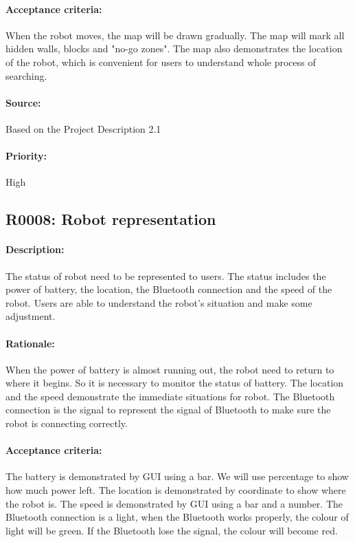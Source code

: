 \documentclass[11pt, a4paper]{report}
\begin{document}
\paragraph{Acceptance criteria:}
When the robot moves, the map will be drawn gradually. The map will mark all hidden walls, blocks and "no-go zones". The map also demonstrates the location of the robot, which is convenient for users to understand whole process of searching.
\paragraph{Source:}
Based on the Project Description 2.1
\paragraph{Priority:}
High



\subsection{R0008: Robot representation}
\paragraph{Description:}
The status of robot need to be represented to users. The status includes the power of battery, the location, the Bluetooth connection and the speed of the robot. Users are able to understand the  robot's situation and make some adjustment.
\paragraph{Rationale:}
When the power of battery is almost running out, the robot need to return to where it begins. So it is necessary to monitor the status of battery. The location and the speed demonstrate the immediate situations for robot. The Bluetooth connection is the signal to represent the signal of Bluetooth to make sure the robot is connecting correctly.
\paragraph{Acceptance criteria:}
The battery is demonstrated by GUI using a bar. We will use percentage to show how much power left. The location is demonstrated by coordinate to show where the robot is. 
The speed is demonstrated by GUI using a bar and a number. 
The Bluetooth connection is a light, when the Bluetooth works properly, the colour of  light will be green. If the Bluetooth lose the signal, the colour will become red.
\end{document}
